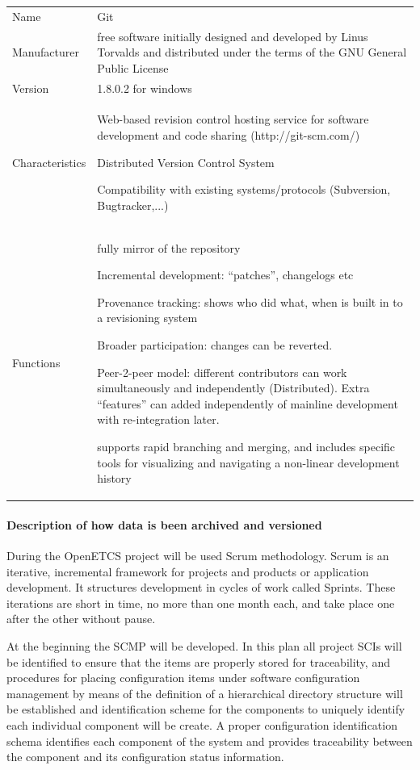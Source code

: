\documentclass{template/openetcs_article}
\begin{document}
\begin{flushleft}
\tablefirsthead{}
\tablehead{}
\tabletail{}
\tablelasttail{}
\begin{tabular}{|m{3cm}|m{11cm}|}
\hline
\rowcolor{myblue}
\multicolumn{2}{|c|}{CMS Tool} \\\hline
Name &
Git \\\hline
Manufacturer &
free software initially designed and developed by Linus Torvalds and distributed under the terms of the GNU General Public License\\\hline
Version &
1.8.0.2 for windows\\\hline
Characteristics &
Web-based revision control hosting service for software development and code sharing (http://git-scm.com/)

Distributed Version Control System

Compatibility with existing systems/protocols (Subversion, Bugtracker,...)\\\hline
Functions &
fully mirror of the repository

Incremental development: ``patches'', changelogs etc

Provenance tracking: shows who did what, when is built in to a revisioning system

Broader participation: changes can be reverted.

Peer-2-peer model: different contributors can work simultaneously and independently (Distributed). Extra ``features'' can added independently of mainline development with re-integration later. 

supports rapid branching and merging, and includes specific tools for visualizing and navigating a non-linear development history\\\hline
\end{tabular}
\end{flushleft}


\paragraph{Description of how data is been archived and versioned}

During the OpenETCS project will be used Scrum methodology. Scrum is an iterative, incremental framework for projects and products or application development. It structures development in cycles of work called Sprints. These iterations are short in time, no more than one month each, and take place one after the other without pause. 

At the beginning the SCMP will be developed. In this plan all project SCIs will be identified to ensure that the items are properly stored for traceability, and procedures for placing configuration items under software configuration management by means of the definition of a hierarchical directory structure will be established and identification scheme for the components to uniquely identify each individual component will be create. A proper configuration identification schema identifies each component of the system and provides traceability between the component and its configuration status information.
\end{document}
